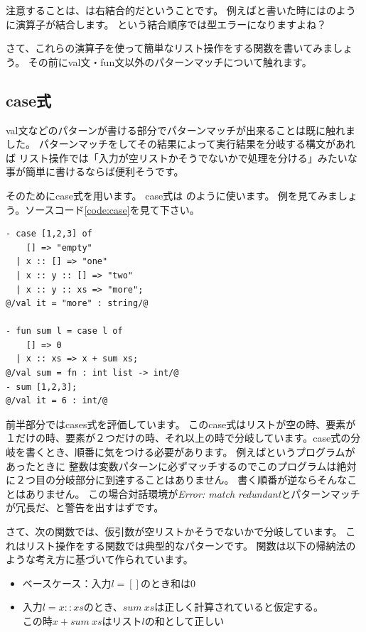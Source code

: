 \documentclass[11pt,a4paper]{jarticle}
\begin{document}
注意することは、\prog{::}は右結合的だということです。
例えばと書いた時にはのように演算子が結合します。
という結合順序では型エラーになりますよね？

さて、これらの演算子を使って簡単なリスト操作をする関数を書いてみましょう。
その前にval文・fun文以外のパターンマッチについて触れます。

\subsection{case式}

val文などのパターンが書ける部分でパターンマッチが出来ることは既に触れました。
パターンマッチをしてその結果によって実行結果を分岐する構文があれば
リスト操作では「入力が空リストかそうでないかで処理を分ける」みたいな事が簡単に書けるならば便利そうです。

そのためにcase式を用います。
case式は
のように使います。
例を見てみましょう。ソースコード\ref{code:case}を見て下さい。

\begin{lstlisting}[caption=case式,label=code:case]
- case [1,2,3] of
    [] => "empty"
  | x :: [] => "one"
  | x :: y :: [] => "two"
  | x :: y :: xs => "more";
@/val it = "more" : string/@

- fun sum l = case l of
    [] => 0
  | x :: xs => x + sum xs;
@/val sum = fn : int list -> int/@
- sum [1,2,3];
@/val it = 6 : int/@
\end{lstlisting}

前半部分ではcases式を評価しています。
このcase式はリストが空の時、要素が１だけの時、要素が２つだけの時、それ以上の時で分岐しています。case式の分岐を書くとき、順番に気をつける必要があります。
例えばというプログラムがあったときに
整数は変数パターンに必ずマッチするのでこのプログラムは絶対に２つ目の分岐部分に到達することはありません。
書く順番が逆ならそんなことはありません。
この場合対話環境が\textit{Error: match redundant}とパターンマッチが冗長だ、と警告を出すはずです。

さて、次の関数では、仮引数が空リストかそうでないかで分岐しています。
これはリスト操作をする関数では典型的なパターンです。
関数は以下の帰納法のような考え方に基づいて作られています。
\begin{itemize}
\item ベースケース：入力$l = []$のとき和は0
\item 入力$l = x :: xs$のとき、$sum \ xs$は正しく計算されていると仮定する。\\
  この時$x + sum \ xs$はリスト$l$の和として正しい
\end{itemize}
\end{document}
